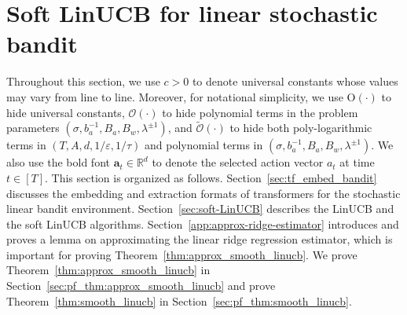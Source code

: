 \documentclass[10pt]{article}
\newcommand{\eps}{\varepsilon}
\renewcommand{\cO}{\mathcal{O}}
\newcommand{\<}{\left\langle}
\renewcommand{\>}{\right\rangle}
\newcommand{\R}{\mathbb{R}}
\newcommand{\temp}{{\tau}}
\newcommand{\tcO}{{\tilde{\mathcal O}}}
\newcommand{\action}{{a}}
\newcommand{\totlen}{{T}}
\newcommand{\conO}{{\mathrm{O}}}
\def\ba{{\mathbf a}}
\begin{document}
\section{Soft LinUCB for linear stochastic bandit}\label{app:linUCB}
Throughout this section, we use $c>0$ to denote universal constants whose values may vary from line to line.
Moreover, for notational simplicity, we use $\conO(\cdot)$ to hide universal constants, $\cO(\cdot)$ to hide polynomial terms in the problem parameters $(\sigma,b_a^{-1},B_a,B_w,\lambda^{\pm1})$, and $\tcO(\cdot)$ to hide both poly-logarithmic terms in $(T,A,d,1/\eps,1/\temp)$ and  polynomial terms in  $(\sigma,b_a^{-1},B_a,B_w,\lambda^{\pm1})$. We also use the bold font $\ba_t\in\R^d$ to denote the selected action vector $\action_t$ at time $t\in[\totlen]$.
This section is organized as follows. Section~\ref{sec:tf_embed_bandit} discusses the embedding and extraction formats of transformers for the stochastic linear bandit environment. Section~\ref{sec:soft-LinUCB} describes the LinUCB and the soft LinUCB algorithms. Section~\ref{app:approx-ridge-estimator} introduces and proves a lemma on approximating the linear ridge regression estimator, which is important for proving Theorem~\ref{thm:approx_smooth_linucb}. We prove Theorem~\ref{thm:approx_smooth_linucb} in Section~\ref{sec:pf_thm:approx_smooth_linucb} and prove Theorem~\ref{thm:smooth_linucb} in Section~\ref{sec:pf_thm:smooth_linucb}.
\end{document}
